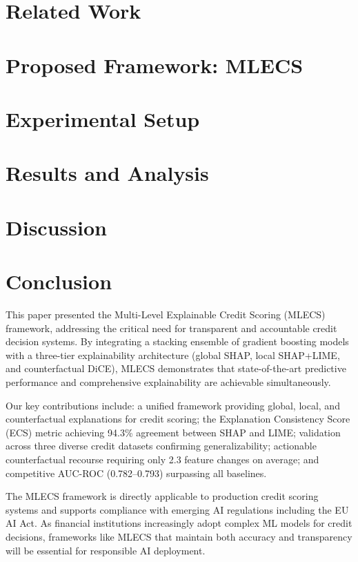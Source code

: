 \documentclass[journal]{IEEEtran}
\begin{document}

\section{Related Work}

\section{Proposed Framework: MLECS}

\section{Experimental Setup}

\section{Results and Analysis}

\section{Discussion}

\section{Conclusion}

This paper presented the Multi-Level Explainable Credit Scoring (MLECS) framework, addressing the critical need for transparent and accountable credit decision systems. By integrating a stacking ensemble of gradient boosting models with a three-tier explainability architecture (global SHAP, local SHAP+LIME, and counterfactual DiCE), MLECS demonstrates that state-of-the-art predictive performance and comprehensive explainability are achievable simultaneously.

Our key contributions include: a unified framework providing global, local, and counterfactual explanations for credit scoring; the Explanation Consistency Score (ECS) metric achieving 94.3\% agreement between SHAP and LIME; validation across three diverse credit datasets confirming generalizability; actionable counterfactual recourse requiring only 2.3 feature changes on average; and competitive AUC-ROC (0.782--0.793) surpassing all baselines.

The MLECS framework is directly applicable to production credit scoring systems and supports compliance with emerging AI regulations including the EU AI Act. As financial institutions increasingly adopt complex ML models for credit decisions, frameworks like MLECS that maintain both accuracy and transparency will be essential for responsible AI deployment.



\end{document}
